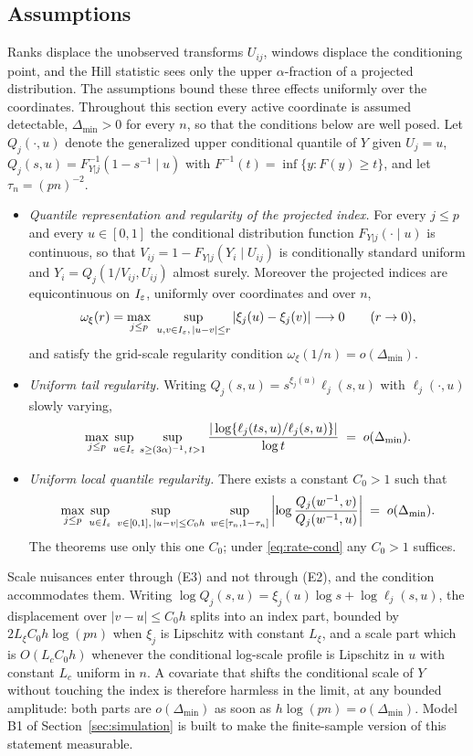 \documentclass[bj,authoryear]{imsart}
\theoremstyle{plain}
\begin{document}
\subsection{Assumptions}

Ranks displace the unobserved transforms $U_{ij}$, windows displace the
conditioning point, and the Hill statistic sees only the upper
$\alpha$-fraction of a projected distribution. The assumptions bound these
three effects uniformly over the coordinates. Throughout this section
every active coordinate is assumed detectable, $\Delta_{\min}>0$ for
every $n$, so that the conditions below are well posed. Let
$Q_j(\cdot,u)$ denote the generalized upper conditional quantile of $Y$
given $U_j=u$, $Q_j(s,u)=F_{Y|j}^{-1}(1-s^{-1}\mid u)$ with
$F^{-1}(t)=\inf\{y:F(y)\ge t\}$, and let $\tau_n=(pn)^{-2}$.

\begin{itemize}
\item[(E1)] \emph{Quantile representation and regularity of the projected
index.} For every $j\le p$ and every $u\in[0,1]$ the conditional
distribution function $F_{Y|j}(\cdot\mid u)$ is continuous, so that
$V_{ij}=1-F_{Y|j}(Y_i\mid U_{ij})$ is conditionally standard uniform and
$Y_i=Q_j(1/V_{ij},U_{ij})$ almost surely. Moreover the projected indices
are equicontinuous on $I_\varepsilon$, uniformly over coordinates and over $n$,
\[
 \omega_\xi(r)=\max_{j\le p}\;
 \sup_{u,v\in I_\varepsilon,\,|u-v|\le r}|\xi_j(u)-\xi_j(v)|
 \longrightarrow0\qquad(r\to0),
\]
and satisfy the grid-scale regularity condition
$\omega_\xi(1/n)=o(\Delta_{\min})$.
\item[(E2)] \emph{Uniform tail regularity.} Writing
$Q_j(s,u)=s^{\xi_j(u)}\ell_j(s,u)$ with $\ell_j(\cdot,u)$ slowly varying,
\[
 \max_{j\le p}\,\sup_{u\in I_\varepsilon}\,
 \sup_{s\ge(3\alpha)^{-1},\,t>1}
 \frac{|\log\{\ell_j(ts,u)/\ell_j(s,u)\}|}{\log t}
 \;=\;o(\Delta_{\min}).
\]
\item[(E3)] \emph{Uniform local quantile regularity.} There exists a
constant $C_0>1$ such that
\[
 \max_{j\le p}\,
 \sup_{u\in I_\varepsilon}\;
 \sup_{v\in[0,1],\,|u-v|\le C_0h}\;
 \sup_{w\in[\tau_n,1-\tau_n]}
 \left|\log\frac{Q_j(w^{-1},v)}{Q_j(w^{-1},u)}\right|
 \;=\;o(\Delta_{\min}).
\]
The theorems use only this one $C_0$; under \eqref{eq:rate-cond} any
$C_0>1$ suffices.
\end{itemize}

Scale nuisances enter through (E3) and not through (E2), and the
condition accommodates them. Writing
$\log Q_j(s,u)=\xi_j(u)\log s+\log\ell_j(s,u)$, the displacement over
$|v-u|\le C_0h$ splits into an index part, bounded by
$2L_\xi C_0h\log(pn)$ when $\xi_j$ is Lipschitz with constant $L_\xi$,
and a scale part which is $O(L_cC_0h)$ whenever the conditional
log-scale profile is Lipschitz in $u$ with constant $L_c$ uniform in
$n$. A covariate that shifts the conditional scale of $Y$ without
touching the index is therefore harmless in the limit, at any bounded
amplitude: both parts are $o(\Delta_{\min})$ as soon as
$h\log(pn)=o(\Delta_{\min})$. Model B1 of
Section~\ref{sec:simulation} is built to make the finite-sample
version of this statement measurable.
\end{document}
